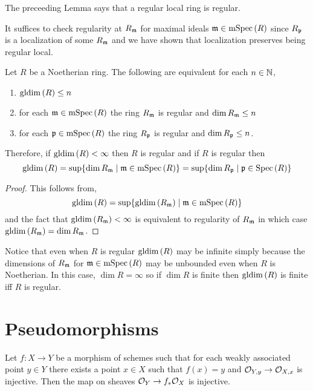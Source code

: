\documentclass[12pt]{article}
\begin{document}
\begin{rmk}
The preceeding Lemma says that a regular local ring is regular. 
\end{rmk}

\begin{rmk}
It suffices to check regularity at $R_{\mathfrak{m}}$ for maximal ideals $\mathfrak{m} \in \mathrm{mSpec}\left( R \right)$ since $R_{\mathfrak{p}}$ is a localization of some $R_{\mathfrak{m}}$ and we have shown that localization preserves being regular local.
\end{rmk}

\begin{prop}
Let $R$ be a Noetherian ring. The following are equivalent for each $n \in \mathbb{N}$,
\begin{enumerate}
\item $\mathrm{gldim}\left( R \right) \le n$

\item for each $\mathfrak{m} \in \mathrm{mSpec}\left( R \right)$ the ring $R_{\mathfrak{m}}$ is regular and $\dim{R_{\mathfrak{m}}} \le n$

\item for each $\mathfrak{p} \in \mathrm{mSpec}\left( R \right)$ the ring $R_{\mathfrak{p}}$ is regular and $\dim{R_{\mathfrak{p}}} \le n$.
\end{enumerate}
Therefore, if $\mathrm{gldim}\left( R \right) < \infty$ then $R$ is regular and if $R$ is regular then
\[ \mathrm{gldim}\left( R \right) = \sup \{ \dim{R_{\mathfrak{m}}} \mid \mathfrak{m} \in \mathrm{mSpec}\left( R \right) \} = \sup \{ \dim{R_{\mathfrak{p}}} \mid \mathfrak{p} \in \mathrm{Spec}\left( R \right) \} \]
\end{prop}

\begin{proof}
This follows from,
\[ \mathrm{gldim}\left( R \right) = \sup \{ \mathrm{gldim}\left( R_{\mathfrak{m}} \right) \mid \mathfrak{m} \in \mathrm{mSpec}\left( R \right) \} \]
and the fact that $\mathrm{gldim}\left( R_{\mathfrak{m}} \right) < \infty$ is equivalent to regularity of $R_{\mathfrak{m}}$ in which case $\mathrm{gldim}\left( R_{\mathfrak{m}} \right) = \dim{R_{\mathfrak{m}}}$. 
\end{proof}

\begin{rmk}
Notice that even when $R$ is regular $\mathrm{gldim}\left( R \right)$ may be infinite simply because the dimensions of $R_{\mathfrak{m}}$ for $\mathfrak{m} \in \mathrm{mSpec}\left( R \right)$ may be unbounded even when $R$ is Noetherian. In this case, $\dim{R} = \infty$ so if $\dim{R}$ is finite then $\mathrm{gldim}\left( R \right)$ is finite iff $R$ is regular.
\end{rmk}

\section{Pseudomorphisms}

\begin{lemma}
Let $f : X \to Y$ be a morphism of schemes such that for each weakly associated point $y \in Y$ there exists a point $x \in X$ such that $f(x) = y$ and $\mathcal{O}_{Y, y} \to \mathcal{O}_{X, x}$ is injective. Then the map on sheaves $\mathcal{O}_{Y} \to f_* \mathcal{O}_{X}$ is injective.
\end{lemma}
\end{document}
